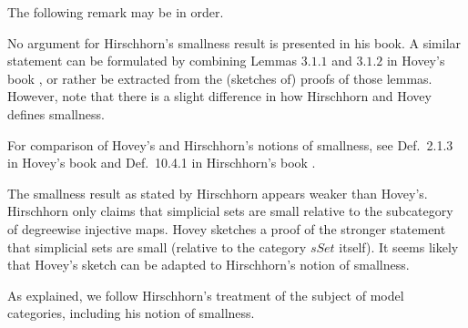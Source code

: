 The following remark may be in order.
\begin{remark}
No argument for Hirschhorn's smallness result \cite[Ex.~10.4.4]{Hi03} is presented in his book. A similar statement can be formulated by combining Lemmas $3.1.1$ and $3.1.2$ in Hovey's book \cite[pp.~74]{Ho99}, or rather be extracted from the (sketches of) proofs of those lemmas. However, note that there is a slight difference in how Hirschhorn and Hovey defines smallness.

For comparison of Hovey's and Hirschhorn's notions of smallness, see Def.~2.1.3 in Hovey's book \cite[p.~29]{Ho99} and Def.~10.4.1 in Hirschhorn's book \cite[p.~194]{Hi03}.

The smallness result as stated by Hirschhorn appears weaker than Hovey's. Hirschhorn only claims that simplicial sets are small relative to the subcategory of degreewise injective maps. Hovey sketches a proof of the stronger statement that simplicial sets are small (relative to the category $sSet$ itself). It seems likely that Hovey's sketch can be adapted to Hirschhorn's notion of smallness.
\end{remark}
\noindent As explained, we follow Hirschhorn's treatment of the subject of model categories, including his notion of smallness.

